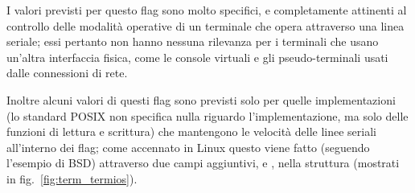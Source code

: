 I valori previsti per questo flag sono molto specifici, e completamente
attinenti al controllo delle modalità operative di un terminale che opera
attraverso una linea seriale; essi pertanto non hanno nessuna rilevanza per i
terminali che usano un'altra interfaccia fisica, come le console virtuali e
gli pseudo-terminali usati dalle connessioni di rete.

Inoltre alcuni valori di questi flag sono previsti solo per quelle
implementazioni (lo standard POSIX non specifica nulla riguardo
l'implementazione, ma solo delle funzioni di lettura e scrittura) che
mantengono le velocità delle linee seriali all'interno dei flag; come
accennato in Linux questo viene fatto (seguendo l'esempio di BSD) attraverso
due campi aggiuntivi,  e , nella struttura
 (mostrati in fig.~\ref{fig:term_termios}).

